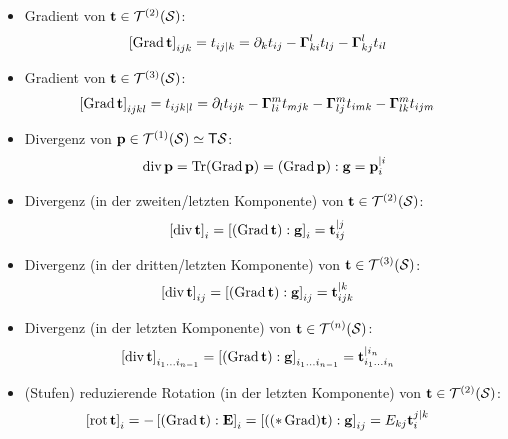 \documentclass[a4paper,11pt]{scrartcl}
\newcommand{\tspace}{\mathcal{T}^{(2)}(\surf)}
\newcommand{\Tr}{\text{Tr}}
\begin{document}
\begin{itemize}
  \item Gradient von \( \tb\in\tspace \):
    \begin{align}
        \left[ \operatorname{Grad}\mathbf{t} \right]_{ijk} &= t_{ij|k}
              = \partial_{k}t_{ij} - \mathbf{\Gamma}{_{ki}^{l}}t_{lj} - \mathbf{\Gamma}{_{kj}^{l}}t_{il}
    \end{align}
  \item Gradient von \( \mathbf{t}\in\mathcal{T}^{(3)}(\mathcal{S}) \):
    \begin{align}
        \left[ \operatorname{Grad}\mathbf{t} \right]_{ijkl} &= t_{ijk|l}
              = \partial_{l}t_{ijk} - \mathbf{\Gamma}{_{li}^{m}}t_{mjk} - \mathbf{\Gamma}{_{lj}^{m}}t_{imk} -
              \mathbf{\Gamma}{_{lk}^{m}}t_{ijm}
    \end{align}
  \item Divergenz von \( \mathbf{p} \in \mathcal{T}^{(1)}(\mathcal{S}) \simeq \mathsf{T}\mathcal{S} \):
    \begin{align}
      \div\pb = \Tr(\Grad\pb) = (\Grad\pb):\gb = \tensor{p}{_{i}^{|i}}
    \end{align}
  \item Divergenz (in der zweiten/letzten Komponente) von \( \tb\in\tspace \):
      \begin{align}
        \left[ \operatorname{div}\mathbf{t} \right]_{i} &= \left[ (\operatorname{Grad}\mathbf{t}) : \mathbf{g} \right]_{i} = \mathbf{t}{_{ij}^{|j}}
      \end{align}
  \item Divergenz (in der dritten/letzten Komponente) von \( \mathbf{t}\in\mathcal{T}^{(3)}(\mathcal{S}) \):
      \begin{align}
        \left[ \operatorname{div}\mathbf{t} \right]_{ij} &= \left[ (\operatorname{Grad}\mathbf{t}) : \mathbf{g} \right]_{ij} = \mathbf{t}{_{ijk}^{|k}}
      \end{align}
  \item Divergenz (in der letzten Komponente) von \( \mathbf{t}\in\mathcal{T}^{(n)}(\mathcal{S}) \):
      \begin{align}
        \left[ \operatorname{div}\mathbf{t} \right]_{i_{1}\ldots i_{n-1}} &= \left[ (\operatorname{Grad}\mathbf{t}) : \mathbf{g} \right]_{i_{1}\ldots i_{n-1}} 
                      = \mathbf{t}{_{i_{1}\ldots i_{n}}^{|i_{n}}}
      \end{align}
  \item (Stufen) reduzierende Rotation (in der letzten Komponente) von \( \tb\in\tspace \):
      \begin{align}
        \left[ \operatorname{rot}\mathbf{t} \right]_{i} &= -\left[(\operatorname{Grad}\mathbf{t}):\mathbf{E}\right]_{i} = \left[((*\operatorname{Grad})\mathbf{t}):\mathbf{g}  \right]_{ij}
                          = E_{kj}\mathbf{t}{_{i}^{j|k}}
      \end{align}

\end{itemize}
\end{document}
